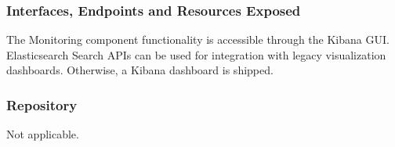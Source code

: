 \subsubsection{Interfaces, Endpoints and Resources Exposed}
The Monitoring component functionality is accessible through the Kibana GUI. Elasticsearch Search APIs can be used for integration with legacy visualization dashboards. Otherwise, a Kibana dashboard is shipped.
\subsubsection{Repository}
Not applicable.
